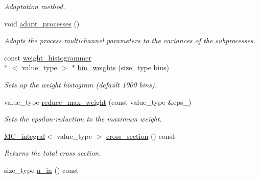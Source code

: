 \begin{DoxyCompactItemize}
\begin{DoxyCompactList}\small\item\em Adaptation method. \end{DoxyCompactList}\item 
void \hyperlink{a00210_addbfc929e753761773ff755ed3fff5dc}{adapt\-\_\-processes} ()
\begin{DoxyCompactList}\small\item\em Adapts the process multichannel parameters to the variances of the subprocesses. \end{DoxyCompactList}\item 
\hypertarget{a00210_a8138a6a1c736c588f0b4298e7f118719}{const \hyperlink{a00576}{weight\-\_\-histogrammer}\\*
$<$ value\-\_\-type $>$ $\ast$ \hyperlink{a00210_a8138a6a1c736c588f0b4298e7f118719}{bin\-\_\-weights} (size\-\_\-type bins)}\label{a00210_a8138a6a1c736c588f0b4298e7f118719}

\begin{DoxyCompactList}\small\item\em Sets up the weight histogram (default 1000 bins). \end{DoxyCompactList}\item 
\hypertarget{a00210_a27e2b6a812ca5eee12c60a67a5718020}{value\-\_\-type \hyperlink{a00210_a27e2b6a812ca5eee12c60a67a5718020}{reduce\-\_\-max\-\_\-weight} (const value\-\_\-type \&eps\-\_\-)}\label{a00210_a27e2b6a812ca5eee12c60a67a5718020}

\begin{DoxyCompactList}\small\item\em Sets the epsilon-\/reduction to the maximum weight. \end{DoxyCompactList}\item 
\hypertarget{a00210_ac74de260f019c79f40f7a326bb9854eb}{\hyperlink{a00363}{M\-C\-\_\-integral}$<$ value\-\_\-type $>$ \hyperlink{a00210_ac74de260f019c79f40f7a326bb9854eb}{cross\-\_\-section} () const }\label{a00210_ac74de260f019c79f40f7a326bb9854eb}

\begin{DoxyCompactList}\small\item\em Returns the total cross section. \end{DoxyCompactList}\item 
\hypertarget{a00210_a7a830b9294b63b89c38d9add14b443ff}{size\-\_\-type \hyperlink{a00210_a7a830b9294b63b89c38d9add14b443ff}{n\-\_\-in} () const }\label{a00210_a7a830b9294b63b89c38d9add14b443ff}


\end{DoxyCompactItemize}
